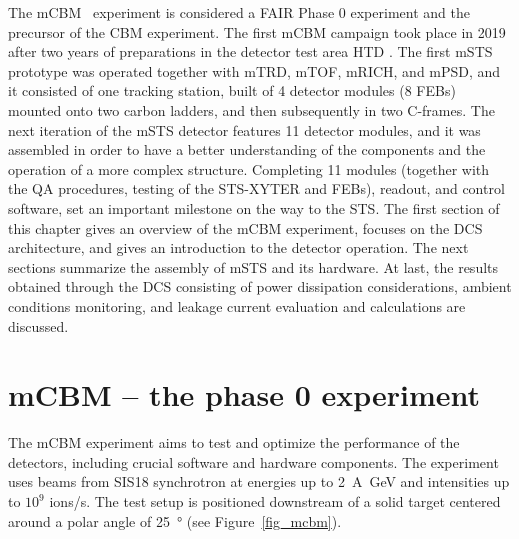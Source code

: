 The mCBM~\cite{mCBM} experiment is considered a \gls{FAIR} Phase \num{0} experiment and the precursor of the \gls{CBM} experiment. The first mCBM campaign took place in \num{2019} after two years of preparations in the detector test area HTD \cite{progress_report_2017_sturm}. The first \gls{mSTS} prototype was operated together with mTRD, mTOF, mRICH, and mPSD, and it consisted of one tracking station, built of \num{4} detector modules (\num{8} \glspl{FEB}) mounted onto two carbon ladders, and then subsequently in two C-frames. The next iteration of the \gls{mSTS} detector features \num{11} detector modules, and it was assembled in order to have a better understanding of the components and the operation of a more complex structure. Completing \num{11} modules (together with the QA procedures, testing of the STS-XYTER and \glspl{FEB}), readout, and control software, set an important milestone on the way to the \gls{STS}. The first section of this chapter gives an overview of the \gls{mCBM} experiment, focuses on the \gls{DCS} architecture, and gives an introduction to the detector operation. The next sections summarize the assembly of \gls{mSTS} and its hardware. At last, the results obtained through the \gls{DCS} consisting of power dissipation considerations, ambient conditions monitoring, and leakage current evaluation and calculations are discussed.

\section{mCBM -- the phase 0 experiment}
The \gls{mCBM} experiment aims to test and optimize the performance of the detectors, including crucial software and hardware components. The experiment uses beams from SIS18 synchrotron at energies up to \SI{2}{\A\giga\eV} and intensities up to $10^{9}$ ions/s. The test setup is positioned downstream of a solid target centered around a polar angle of \SI{25}{\degree} (see Figure~\ref{fig_mcbm}).

